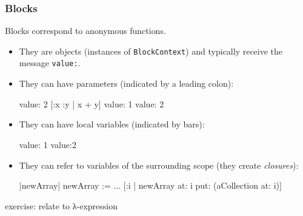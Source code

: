 \begin{frame}[fragile]
\frametitle{Blocks}
Blocks %
correspond to anonymous functions. 

\begin{itemize}
\item They are objects (instances of \texttt{BlockContext}) and
typically receive the message \texttt{value:}.
\item They can have parameters (indicated by a leading colon):

\begin{cplus3}
[:x | 1 + x] value: 2
[:x :y | x + y] value: 1 value: 2
\end{cplus3}

\item They can  have local variables (indicated by bars):
\begin{cplus3}
[:x :y |  |z| z := x + y] value: 1 value:2 
\end{cplus3}

\item They can refer to variables of the surrounding scope
(they create \emph{closures}):
\begin{cplus3}
|newArray|
newArray :=  ... 
[:i | newArray at: i put: (aCollection at: i)]
\end{cplus3}
\end{itemize}

exercise: relate to λ-expression
\end{frame}

